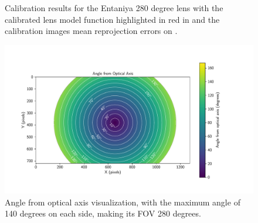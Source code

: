 \begin{figure}[H]
	\centering
	\caption{
		Calibration results for the Entaniya 280 degree lens with the calibrated lens model function highlighted in red in  and the calibration images mean reprojection errors on .
  }
	\label{fig:calib_e}
\end{figure}
\begin{figure}[H]
	\centering
	\includegraphics[width=1.0\textwidth]{./fig/pgfplot/build/viz_ent.pdf}
	\caption{Angle from optical axis visualization, with the maximum angle of 140 degrees on each side, making its \ac{FOV} 280 degrees.}
	\label{fig:calib_ent_viz}
\end{figure}
